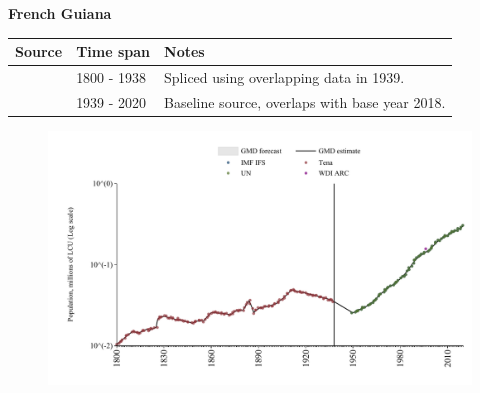 \documentclass[12pt,a4paper,landscape]{article}
\begin{document}
\begin{adjustbox}{max totalsize={\paperwidth}{\paperheight},center}
\begin{minipage}[t][\textheight][t]{\textwidth}
\vspace*{0.5cm}
{}
\begin{center}
{\Large\bfseries French Guiana}
\end{center}
\vspace{0.5cm}
\begin{table}[H]
\centering
\small
\begin{tabular}{|l|l|l|}
\hline
\textbf{Source} & \textbf{Time span} & \textbf{Notes} \\
\hline
\rowcolor{white}\cite{Tena}& 1800 - 1938 &Spliced using overlapping data in 1939.\\
\rowcolor{lightgray}\cite{IMF_IFS}& 1939 - 2020 &Baseline source, overlaps with base year 2018.\\
\hline
\end{tabular}
\end{table}
\begin{figure}[H]
\centering
\includegraphics[width=\textwidth,height=0.6\textheight,keepaspectratio]{graphs/GUF_pop.pdf}
\end{figure}
\end{minipage}
\end{adjustbox}
\end{document}
